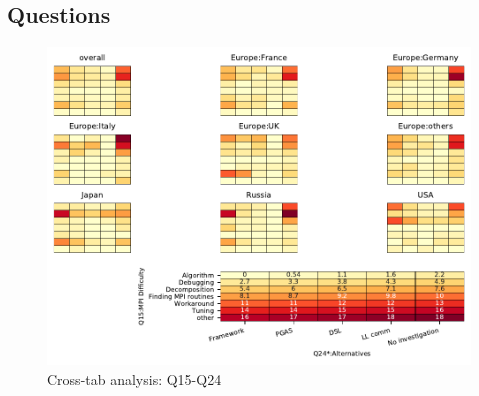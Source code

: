 
\subsection{Questions}


\begin{figure}
\begin{center}
\includegraphics[width=12cm]{../pdfs/Q15-Q24.pdf}
\caption{Cross-tab analysis: Q15-Q24}
\label{fig:Q15-Q24}
\end{center}
\end{figure}
